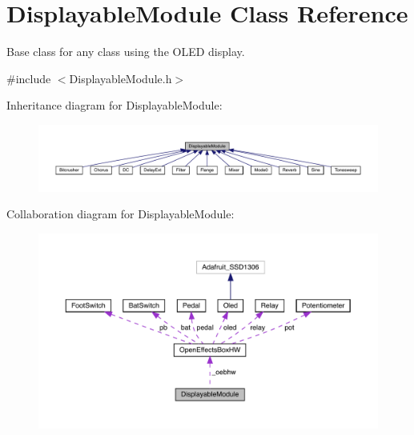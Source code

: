 \hypertarget{class_displayable_module}{}\section{Displayable\+Module Class Reference}
\label{class_displayable_module}


Base class for any class using the O\+L\+ED display.  




{\ttfamily \#include $<$Displayable\+Module.\+h$>$}



Inheritance diagram for Displayable\+Module\+:
\nopagebreak
\begin{figure}[H]
\begin{center}
\leavevmode
\includegraphics[width=350pt]{class_displayable_module__inherit__graph}
\end{center}
\end{figure}


Collaboration diagram for Displayable\+Module\+:
\nopagebreak
\begin{figure}[H]
\begin{center}
\leavevmode
\includegraphics[width=350pt]{class_displayable_module__coll__graph}
\end{center}
\end{figure}

